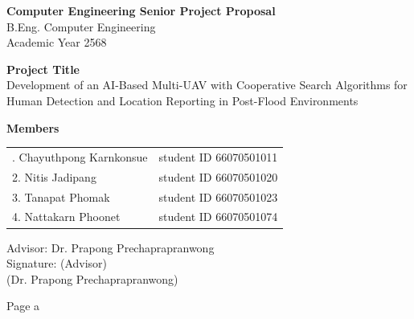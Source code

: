 \documentclass[12pt]{article}
\newcommand{\headerfont}{\fontsize{18pt}{21.6pt}\selectfont}
\newcommand{\infofont}{\fontsize{16pt}{19.2pt}\selectfont}
\begin{document}
\begin{titlepage}
\centering
\infofont
\vspace*{1cm}
{\headerfont\bfseries Computer Engineering Senior Project Proposal}\\[6pt]
{\headerfont B.Eng. Computer Engineering}\\[6pt]
{\headerfont Academic Year 2568}

\vspace{2cm}
{\headerfont\bfseries Project Title}\\[10pt]
{\infofont Development of an AI-Based Multi-UAV with Cooperative Search Algorithms for\\
Human Detection and Location Reporting in Post-Flood Environments}

\vspace{2cm}
{\headerfont\bfseries Members}\\[10pt]
\begin{tabular}{@{}ll@{}}
\infofont 1. Chayuthpong Karnkonsue & student ID 66070501011 \\
2. Nitis Jadipang & student ID 66070501020 \\
3. Tanapat Phomak & student ID 66070501023 \\
4. Nattakarn Phoonet & student ID 66070501074 \\
\end{tabular}

\vspace{2cm}
{\infofont Advisor: Dr. Prapong Prechaprapranwong}\\[20pt]
{\infofont Signature: \underline{\hspace{6cm}} (Advisor)}\\[6pt]
{\infofont (Dr. Prapong Prechaprapranwong)}

\vfill
{\infofont Page \textbar{} a}
\end{titlepage}
\end{document}
